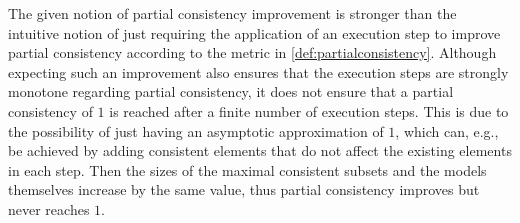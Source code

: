 The given notion of partial consistency improvement is stronger than the intuitive notion of just requiring the application of an execution step to improve partial consistency according to the metric in \autoref{def:partialconsistency}.
Although expecting such an improvement also ensures that the execution steps are strongly monotone regarding partial consistency, it does not ensure that a partial consistency of $1$ is reached after a finite number of execution steps.
This is due to the possibility of just having an asymptotic approximation of $1$, which can, e.g., be achieved by adding consistent elements that do not affect the existing elements in each step.
Then the sizes of the maximal consistent subsets and the models themselves increase by the same value, thus partial consistency improves but never reaches $1$.

